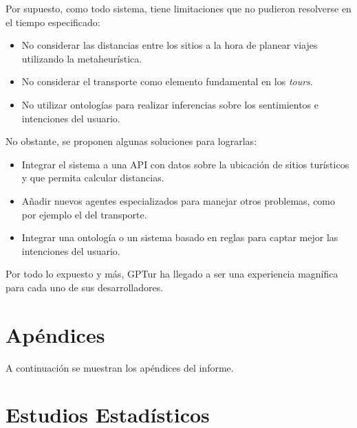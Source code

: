\documentclass[10pt]{llncs}
\begin{document}
Por supuesto, como todo sistema, tiene limitaciones que no pudieron resolverse en el tiempo especificado:
\begin{itemize}
    \item No considerar las distancias entre los sitios a la hora de planear viajes utilizando la metaheurística.
    \item No considerar el transporte como elemento fundamental en los \textit{tours}.
    \item No utilizar ontologías para realizar inferencias sobre los sentimientos e intenciones del usuario.
\end{itemize}

No obstante, se proponen algunas soluciones para lograrlas:
\begin{itemize}
    \item Integrar el sistema a una API con datos sobre la ubicación de sitios turísticos y que permita calcular distancias.
    \item Añadir nuevos agentes especializados para manejar otros problemas, como por ejemplo el del transporte.
    \item Integrar una ontología o un sistema basado en reglas para captar mejor las intenciones del usuario.
\end{itemize}

Por todo lo expuesto y más, GPTur ha llegado a ser una experiencia magnífica para cada uno de sus desarrolladores.

\vspace{\baselineskip}
\printbibliography

\newpage
\section*{Apéndices}
A continuación se muestran los apéndices del informe.
\appendix

\section{Estudios Estadísticos}
\end{document}
